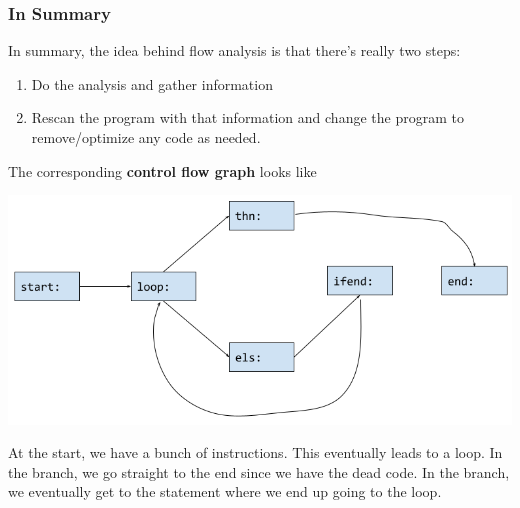 \documentclass[letterpaper]{article}
\begin{document}
\subsubsection{In Summary}
In summary, the idea behind flow analysis is that there's really two steps: 
\begin{enumerate}
    \item Do the analysis and gather information 
    \item Rescan the program with that information and change the program to remove/optimize any code as needed. 
\end{enumerate}
The corresponding \textbf{control flow graph} looks like 
\begin{center}
    \includegraphics[scale=0.5]{../assets/analysis_flow_graph.png}
\end{center}
At the start, we have a bunch of instructions. This eventually leads to a loop. In the  branch, we go straight to the end since we have the dead code. In the  branch, we eventually get to the  statement where we end up going to the loop.
\end{document}
